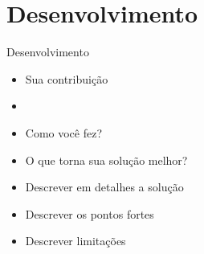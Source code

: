 \section{Desenvolvimento}

\begin{frame}	
	\begin{block}{Desenvolvimento}
		 \begin{itemize}
			  \item Sua contribuição			  
			  \item {\color{red}{A inovação proposta que não existe no estado da arte} }
			  \item Como você fez?
			  \item O que torna sua solução melhor?
			  \item Descrever em detalhes a solução
			  \item Descrever os pontos fortes
			  \item Descrever limitações
		  \end{itemize}
	\end{block}
\end{frame}
